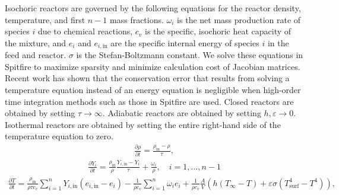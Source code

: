 \documentclass[letterpaper,10pt,english]{sphinxmanual}
\begin{document}
Isochoric reactors are governed by the following equations for the reactor density, temperature, and first \(n-1\) mass fractions.
\(\omega_i\) is the net mass production rate of species \(i\) due to chemical reactions,
\(c_v\) is the specific, isochoric heat capacity of the mixture,
and \(e_i\) and \(e_{i,\mathrm{in}}\) are the specific internal energy of species \(i\) in the feed and reactor.
\(\sigma\) is the Stefan-Boltzmann constant.
We solve these equations in Spitfire to maximize sparsity and minimize calculation cost of Jacobian matrices.
Recent work  has shown that the conservation error that results from solving a temperature equation instead of an energy equation is negligible when high-order time integration methods such as those in Spitfire are used.
Closed reactors are obtained by setting \(\tau\to\infty\).
Adiabatic reactors are obtained by setting \(h,\varepsilon\to0\).
Isothermal reactors are obtained by setting the entire right-hand side of the temperature equation to zero.
\begin{equation}\label{equation:combustion:isochoric_rho_eqn}
\begin{split}\frac{\partial \rho}{\partial t} = \frac{\rho_\mathrm{in} - \rho}{\tau},\end{split}
\end{equation}\begin{equation}\label{equation:combustion:isochoric_Yi_eqn}
\begin{split}\frac{\partial Y_i}{\partial t} = \frac{\rho_\mathrm{in}}{\rho}\frac{Y_{i,\mathrm{in}} - Y_i}{\tau} + \frac{\omega_i}{\rho}, \quad i=1,\ldots,n-1\end{split}
\end{equation}\begin{equation}\label{equation:combustion:isochoric_T_eqn}
\begin{split}\frac{\partial T}{\partial t} = \frac{\rho_\mathrm{in}}{\rho \tau c_v}\sum_{i=1}^{n}Y_{i,\mathrm{in}}(e_{i,\mathrm{in}} - e_i) - \frac{1}{\rho c_v}\sum_{i=1}^{n}\omega_i e_i + \frac{1}{\rho c_v}\frac{A}{V}\left(h(T_\infty - T) + \varepsilon\sigma(T_\mathrm{surf}^4 - T^4)\right),\end{split}
\end{equation}
\end{document}
